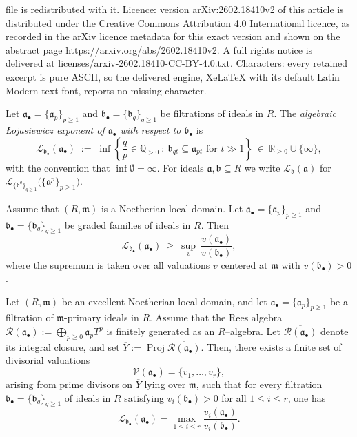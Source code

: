 \documentclass[10pt,a4paper]{amsart}
\DeclareMathOperator{\Proj}{Proj}
\newcommand{\Loj}{\mathcal{L}} %
\newcommand{\QQ}{\mathbb{Q}}
\newcommand{\RR}{\mathbb{R}}
\newcommand{\R}{\mathcal{R}}
\newcommand{\abul}{{\a_\bullet}}
\newcommand{\bbul}{{\b_\bullet}}
\newcommand{\m}{\mathfrak m}
\renewcommand{\a}{\mathfrak{a}}
\renewcommand{\b}{\mathfrak{b}}
\begin{document}
file is redistributed with it. Licence: version arXiv:2602.18410v2 of this article is distributed under the Creative Commons Attribution 4.0 International licence, as recorded in the arXiv licence metadata for this exact version and shown on the abstract page https://arxiv.org/abs/2602.18410v2. A full rights notice is delivered at licenses/arxiv-2602.18410-CC-BY-4.0.txt. Characters: every retained excerpt is pure ASCII, so the delivered engine, XeLaTeX with its default Latin Modern text font, reports no missing character.
\begin{definition}
	\label{def:L-families}
	Let $\abul=\{\a_p\}_{p\ge1}$ and $\bbul=\{\b_q\}_{q\ge1}$ be filtrations
	of ideals in $R$.
	The \emph{algebraic \L ojasiewicz exponent of $\abul$ with respect to $\bbul$} is
	\[
	\Loj_{\bbul}(\abul)
	\;:=\;
	\inf\left\{\frac{q}{p}\in\QQ_{>0}\ :\ \b_{qt}\subseteq \overline{\a_{pt}} \text{ for } t \gg 1\right\}
	\ \in\ \RR_{\ge0} \cup \{\infty\},
	\]
	with the convention that $\inf \emptyset = \infty$. For ideals $\a,\b\subseteq R$ we write $\Loj_{\b}(\a)$ for $\Loj_{\{\b^q\}_{q \ge 1}}\bigl(\{\a^p\}_{p\ge1}\bigr)$.
\end{definition}

\begin{theorem}\label{thm:valuative-filtrations}
	Assume that $(R,\m)$ is a Noetherian local domain. Let $\abul=\{\a_p\}_{p\ge1}$ and
	$\bbul=\{\b_q\}_{q\ge1}$ be graded families of ideals in $R$.
	Then
	\[
	\Loj_{\bbul}(\abul)\ \ge\ \sup_{v}\ \frac{v(\abul)}{v(\bbul)},
	\]
	where the supremum is taken over all valuations $v$ centered at $\m$ with $v(\bbul) > 0$.
\end{theorem}

\begin{theorem}
	\label{thm:finite-testing-fingen}
	Let $(R,\m)$ be an excellent Noetherian local domain, and let
	$\abul=\{\a_p\}_{p\ge1}$ be a filtration of $\m$-primary ideals in $R$.
	Assume that the Rees algebra $\R(\abul):=\bigoplus_{p\ge0}\a_pT^p$
	is finitely generated as an $R$--algebra.
	Let $\overline{\R(\abul)}$ denote its integral closure, and set $\overline{Y}:=\Proj \overline{\R(\abul)}.$
	Then, there exists a finite set of divisorial valuations
	\[
	\mathcal V(\abul)=\{v_1,\dots,v_r\},
	\]
	arising from prime divisors on $\overline{Y}$ lying over $\m$, such that for every filtration $\bbul=\{\b_q\}_{q\ge1}$ of ideals in $R$ satisfying $v_i(\bbul) > 0$ for all $1 \le i \le r$, one has
	\[
	\Loj_{\bbul}(\abul)
	=
	\max_{1\le i\le r}
	\frac{v_i(\abul)}{v_i(\bbul)}.
	\]
\end{theorem}
\end{document}
